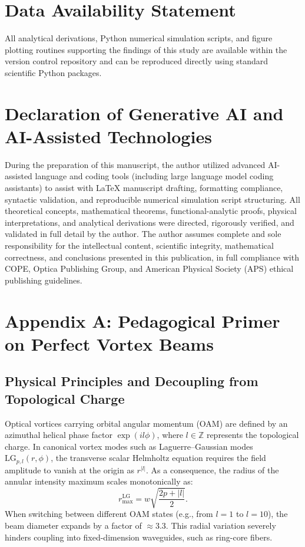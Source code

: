 \documentclass[11pt,a4paper]{article}
\begin{document}
\section*{Data Availability Statement}
All analytical derivations, Python numerical simulation scripts, and figure plotting routines supporting the findings of this study are available within the version control repository and can be reproduced directly using standard scientific Python packages.

\section*{Declaration of Generative AI and AI-Assisted Technologies}
During the preparation of this manuscript, the author utilized advanced AI-assisted language and coding tools (including large language model coding assistants) to assist with LaTeX manuscript drafting, formatting compliance, syntactic validation, and reproducible numerical simulation script structuring. All theoretical concepts, mathematical theorems, functional-analytic proofs, physical interpretations, and analytical derivations were directed, rigorously verified, and validated in full detail by the author. The author assumes complete and sole responsibility for the intellectual content, scientific integrity, mathematical correctness, and conclusions presented in this publication, in full compliance with COPE, Optica Publishing Group, and American Physical Society (APS) ethical publishing guidelines.

\appendix

\section{Appendix A: Pedagogical Primer on Perfect Vortex Beams}
\label{app:primer}

\subsection{Physical Principles and Decoupling from Topological Charge}

Optical vortices carrying orbital angular momentum (OAM) are defined by an azimuthal helical phase factor $\exp(i l \phi)$, where $l \in \mathbb{Z}$ represents the topological charge. In canonical vortex modes such as Laguerre--Gaussian modes $\text{LG}_{p, l}(r, \phi)$, the transverse scalar Helmholtz equation requires the field amplitude to vanish at the origin as $r^{|l|}$. As a consequence, the radius of the annular intensity maximum scales monotonically as:
\begin{equation}
r_{\max}^{\text{LG}} = w \sqrt{\frac{2p + |l|}{2}}.
\end{equation}
When switching between different OAM states (e.g., from $l=1$ to $l=10$), the beam diameter expands by a factor of $\approx 3.3$. This radial variation severely hinders coupling into fixed-dimension waveguides, such as ring-core fibers.
\end{document}
